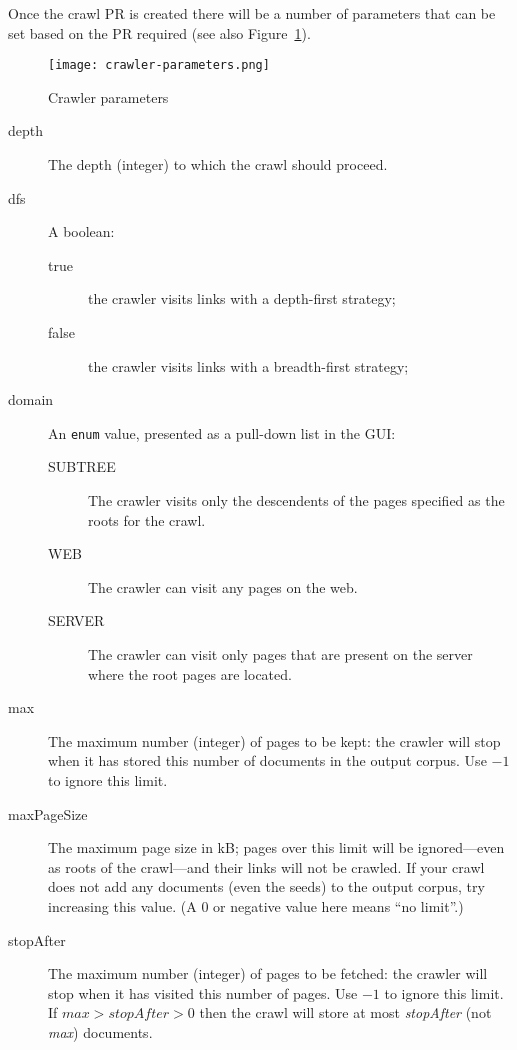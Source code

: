 Once the crawl PR is created there will be a number of parameters that can be
set based on the PR required (see also Figure~\ref{fig:crawler-parameters}).
%
\begin{figure}[htb]
  \begin{center}
    \texttt{[image: crawler-parameters.png]}
  \end{center}
  \caption{Crawler parameters}
  \label{fig:crawler-parameters}
\end{figure}
% 
\begin{description}
\item[depth] The depth (integer) to which the crawl should proceed.
\item[dfs] A boolean:
  \begin{description}
  \item[true] the crawler visits links with a depth-first strategy;
  \item[false] the crawler visits links with a breadth-first strategy;
  \end{description}
\item[domain] An \texttt{enum} value, presented as a pull-down list in the GUI:
  \begin{description}
  \item[SUBTREE] The crawler visits only the descendents of the pages
    specified as the roots for the crawl.
  \item[WEB] The crawler can visit any pages on the web.
  \item[SERVER] The crawler can visit only pages that are present on the
    server where the root pages are located.
  \end{description}
\item[max] The maximum number (integer) of pages to be kept: the crawler will
  stop when it has stored this number of documents in the output corpus.  Use
  $-1$ to ignore this limit.
\item[maxPageSize] The maximum page size in kB; pages over this limit will be
  ignored---even as roots of the crawl---and their links will not be crawled.
  If your crawl does not add any documents (even the seeds) to the output
  corpus, try increasing this value.  (A 0 or negative value here means ``no
  limit''.)
\item[stopAfter] The maximum number (integer) of pages to be fetched: the
  crawler will stop when it has visited this number of pages.  Use $-1$ to
  ignore this limit.  If $\mathit{max} > \mathit{stopAfter} > 0$ then the
  crawl will store at most \emph{stopAfter} (not \emph{max}) documents.

\end{description}
